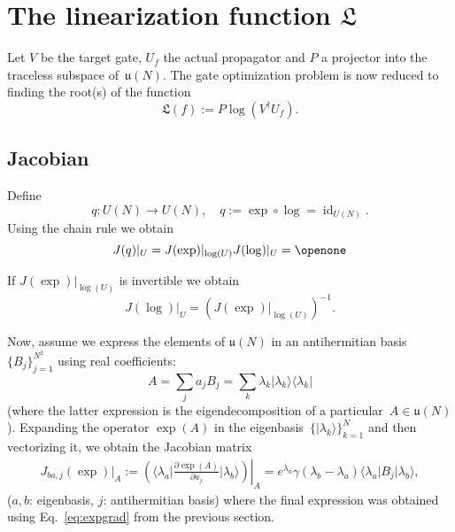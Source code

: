 \documentclass[aps,pra,12pt,showpacs,showkeys,nofootinbib,superscriptaddress,longbibliography]{revtex4}
\newcommand{\bra}[1]{\mbox{$\langle #1|$}}
\newcommand{\ket}[1]{\mbox{$|#1\rangle$}}
\newcommand{\ketbra}[2]{\mbox{$|#1\rangle\langle #2|$}}
\DeclareMathOperator{\id}{id} %
\newcommand{\I}{\openone}     %
\newcommand{\mf}[1]{\mathfrak{#1}}
\newcommand{\pde}[2]{\frac{\partial #1}{\partial #2}}
\newcommand{\be}{\begin{equation}}
\newcommand{\ee}{\end{equation}}
\begin{document}
\section{The linearization function $\mf{L}$}



Let $V$ be the target gate, $U_f$ the actual propagator and $P$ a
projector into the traceless subspace of~$\mf{u}(N)$. The gate
optimization problem is now reduced to finding the root(s) of the function
\be
\mf{L}(f) := P \log(V^\dagger U_f).
\ee




\subsection{Jacobian}


Define
\be
q: U(N) \to U(N), \quad q := \exp \circ \log = \id_{U(N)}.
\ee
Using the chain rule we obtain
\be
J(q)|_{U} = J(\exp)|_{\log(U)} J(\log)|_{U} = \I
\ee

If $J(\exp)|_{\log(U)}$ is invertible we obtain
\be
\label{eq:invJ}
J(\log)|_{U} =  (J(\exp)|_{\log(U)})^{-1}.
\ee

Now, assume we express the elements of
$\mf{u}(N)$
in an antihermitian basis~$\{B_j\}_{j=1}^{N^2}$ using real coefficients:
\be
A = \sum_j a_j B_j = \sum_k \lambda_k \ketbra{\lambda_k}{\lambda_k}
\ee
(where the latter expression is the eigendecomposition of a
particular~$A \in \mf{u}(N)$).
Expanding the operator $\exp(A)$ in the eigenbasis~$\{\ket{\lambda_k}\}_{k=1}^N$ and then vectorizing it, we
obtain the Jacobian matrix
\begin{align}
J_{ba,j}(\exp)|_A
:= \left.\left(\bra{\lambda_a}  \pde{\exp(A)}{a_j} \ket{\lambda_b} \right) \right|_A
= e^{\lambda_a} \gamma(\lambda_b - \lambda_a) \bra{\lambda_a} B_j \ket{\lambda_b},
\end{align}
($a,b$: eigenbasis, $j$: antihermitian basis)
where the final expression was obtained using Eq.~\eqref{eq:expgrad} from the previous section.
\end{document}
